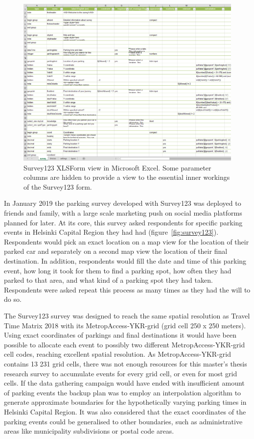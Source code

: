 \begin{figure}[H]%
    \includegraphics[width=\textwidth]{images/survey123_xlsform.png}
    \caption[Survey123 XLSForm view]{Survey123 XLSForm view in Microsoft Excel. Some parameter columns are hidden to provide a view to the essential inner workings of the Survey123 form.}%
    \label{fig:survey123_xlsform}%
\end{figure}

In January 2019 the parking survey developed with Survey123 was deployed to friends and family, with a large scale marketing push on social media platforms planned for later. At its core, this survey asked respondents for specific parking events in Helsinki Capital Region they had had (figure~\ref{fig:survey123}). Respondents would pick an exact location on a map view for the location of their parked car and separately on a second map view the location of their final destination. In addition, respondents would fill the date and time of this parking event, how long it took for them to find a parking spot, how often they had parked to that area, and what kind of a parking spot they had taken. Respondents were asked repeat this process as many times as they had the will to do so.

The Survey123 survey was designed to reach the same spatial resolution as Travel Time Matrix 2018 with its MetropAccess-YKR-grid (grid cell 250 x 250 meters). Using exact coordinates of parkings and final destinations it would have been possible to allocate each event to possibly two different MetropAccess-YKR-grid cell codes, reaching excellent spatial resolution. As MetropAccess-YKR-grid contains 13 231 grid cells, there was not enough resources for this master's thesis research survey to accumulate events for every grid cell, or even for most grid cells. If the data gathering campaign would have ended with insufficient amount of parking events the backup plan was to employ an interpolation algorithm to generate approximate boundaries for the hypothetically varying parking times in Helsinki Capital Region. It was also considered that the exact coordinates of the parking events could be generalised to other boundaries, such as administrative areas like municipality subdivisions or postal code areas. 

